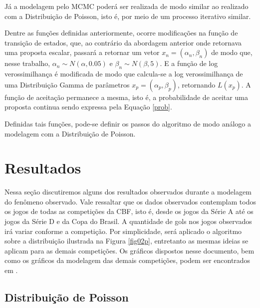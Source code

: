 \documentclass[11pt,letterpaper,twocolumn]{article}
\begin{document}
Já a modelagem pelo MCMC poderá ser realizada de modo similar ao realizado com a Distribuição de Poisson, isto é, por meio de um processo iterativo similar.

Dentre as funções definidas anteriormente, ocorre modificações na função de transição de estados, que, ao contrário da abordagem anterior onde retornava uma proposta escalar, passará a retornar um vetor $x_n = \left(\alpha_n, \beta_n\right)$ de modo que, nesse trabalho, $\alpha_{n}\sim N(\alpha, 0.05)$ e $\beta_{n}\sim N(\beta, 5)$. E a função de log verossimilhança é modificada de modo que calcula-se a log verossimilhança de uma Distribuição Gamma de parâmetros $x_p = \left(\alpha_p, \beta_p\right)$, retornando $L(x_p)$. A função de aceitação permanece a mesma, isto é, a probabilidade de aceitar uma proposta continua sendo expressa pela Equação \ref{prob}.

Definidas tais funções, pode-se definir os passos do algoritmo de modo análogo a modelagem com a Distribuição de Poisson.

\section{Resultados}
\justify

Nessa seção discutiremos alguns dos resultados observados durante a modelagem do fenômeno observado. Vale ressaltar que os dados observados contemplam todos os jogos de todas as competições da CBF, isto é, desde os jogos da Série A até os jogos da Série D e da Copa do Brasil. A quantidade de gols nos jogos observados irá variar conforme a competição. Por simplicidade, será aplicado o algoritmo sobre a distribuição ilustrada na Figura \ref{fig02p}, entretanto as mesmas ideias se aplicam para as demais competições. Os gráficos dispostos nesse documento, bem como os gráficos da modelagem das demais competições, podem ser encontrados em \cite{trabalho}.

\subsection{Distribuição de Poisson}
\justify
\end{document}
